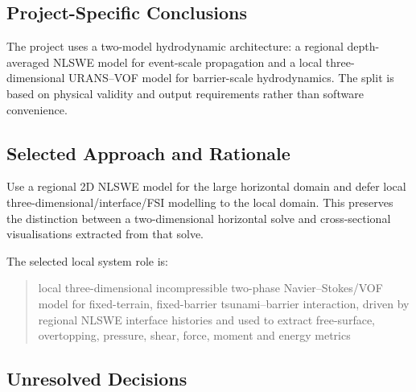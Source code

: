 
\subsection{Project-Specific Conclusions}
\label{sec:res-mod-sys-conclusions}


The project uses a two-model hydrodynamic architecture: a regional
depth-averaged NLSWE model for event-scale propagation and a local
three-dimensional URANS--VOF model for barrier-scale hydrodynamics.
The split is based on physical validity and output requirements rather
than software convenience.

\subsection{Selected Approach and Rationale}
\label{sec:res-mod-sys-selected-approach}


Use a regional 2D NLSWE model for the large horizontal domain and defer
local three-dimensional/interface/FSI modelling to the local domain.
This preserves the distinction between a two-dimensional horizontal
solve and cross-sectional visualisations extracted from that solve.

The selected local system role is:

\begin{quote}
  local three-dimensional incompressible two-phase
  Navier--Stokes/VOF model for fixed-terrain, fixed-barrier
  tsunami--barrier interaction, driven by regional NLSWE interface
  histories and used to extract free-surface, overtopping, pressure,
  shear, force, moment and energy metrics
\end{quote}

\subsection{Unresolved Decisions}
\label{sec:res-mod-sys-unresolved-decisions}


